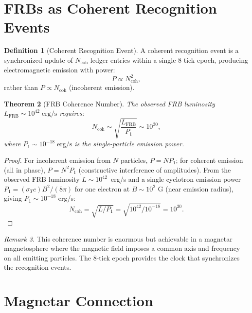 \documentclass[12pt,a4paper]{article}
\newtheorem{theorem}{Theorem}[section]
\theoremstyle{definition}
\newtheorem{definition}[theorem]{Definition}
\theoremstyle{remark}
\newtheorem{remark}[theorem]{Remark}
\begin{document}
\section{FRBs as Coherent Recognition Events}
\label{sec:mechanism}

\begin{definition}[Coherent Recognition Event]
A coherent recognition event is a synchronized update of
$N_{\mathrm{coh}}$ ledger entries within a single 8-tick epoch,
producing electromagnetic emission with power:
\begin{equation}
  P \propto N_{\mathrm{coh}}^2,
\end{equation}
rather than $P \propto N_{\mathrm{coh}}$ (incoherent emission).
\end{definition}

\begin{theorem}[FRB Coherence Number]
The observed FRB luminosity $L_{\mathrm{FRB}} \sim
10^{42}\;\mathrm{erg/s}$ requires:
\begin{equation}
  N_{\mathrm{coh}} \sim \sqrt{\frac{L_{\mathrm{FRB}}}{P_1}}
  \sim 10^{30},
\end{equation}
where $P_1 \sim 10^{-18}\;\mathrm{erg/s}$ is the single-particle
emission power.
\end{theorem}

\begin{proof}
For incoherent emission from $N$ particles, $P = N P_1$; for coherent
emission (all in phase), $P = N^2 P_1$ (constructive interference of
amplitudes).  From the observed FRB luminosity $L \sim 10^{42}$~erg/s
and a single cyclotron emission power $P_1 = (\sigma_T c) B^2/(8\pi)$
for one electron at $B \sim 10^2$ G (near emission radius), giving
$P_1 \sim 10^{-18}$ erg/s:
\[
  N_{\mathrm{coh}} = \sqrt{L/P_1} = \sqrt{10^{42}/10^{-18}} = 10^{30}.
\]
\end{proof}

\begin{remark}
This coherence number is enormous but achievable in a magnetar
magnetosphere where the magnetic field imposes a common axis and
frequency on all emitting particles.  The 8-tick epoch provides the
clock that synchronizes the recognition events.
\end{remark}

\section{Magnetar Connection}
\label{sec:magnetar}
\end{document}
